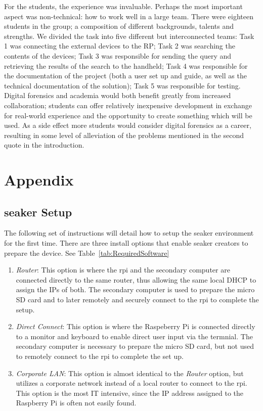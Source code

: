 \documentclass[12pt]{article}
\begin{document}
For the students, the experience was invaluable. Perhaps the most important aspect was non-technical:
how to work well in a large team. There were eighteen students in the group; a composition of different
backgrounds, talents and strengths. We divided the task into five different but interconnected teams:
Task 1 was connecting the external devices to the RP; Task 2 was searching the contents of the
devices; Task 3 was responsible for sending the query and retrieving the results of the search to the
handheld; Task 4 was responsible for the documentation of the project (both a user set up and guide,
as well as the technical documentation of the solution); Task 5 was responsible for testing.\\

Digital forensics and academia would both benefit greatly from increased collaboration; students can
offer relatively inexpensive development in exchange for real-world experience and the opportunity to
create something which will be used. As a side effect more students would consider digital forensics
as a career, resulting in some level of alleviation of the problems mentioned in the second quote in the
introduction\cite{hitchcock2016tiered}.


\section{Appendix}
\label{sect-Appendix}

\subsection{\gls{seaker} Setup}
The following set of instructions will detail how to setup the \gls{seaker}
environment for the first time. There are three install options that
enable \gls{seaker} creators to prepare the device.  See
Table~\ref{tab:RequiredSoftware}

\begin{enumerate}
  \item {\em Router}: This option is where the \gls{rpi} and the
  secondary computer are connected directly to the same router, thus
  allowing the same local DHCP to assign the IPs of both.  The
  secondary computer is used to prepare the micro SD card and to later
  remotely and securely connect to the \gls{rpi} to complete the
  setup.
  
  \item {\em Direct Connect}: This option is where the Raspeberry Pi
  is connected directly to a monitor and keyboard to enable direct
  user input via the termnial.  The secondary computer is necessary to
  prepare the micro SD card, but not used to remotely connect to the
  \gls{rpi} to complete the set up.

  \item {\em Corporate LAN}: This option is almost identical to the
  {\em Router} option, but utilizes a corporate network instead of
  a local router to connect to the \gls{rpi}.  This option is the
  most IT intensive, since the IP address assigned to the Raspberry
  Pi is often not easily found.
\end{enumerate}
\end{document}
